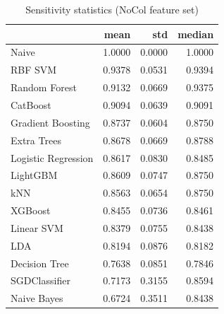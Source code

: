 \begin{table}
\caption{Sensitivity statistics (NoCol feature set)}
\label{tab:sensitivity_NoCol_stats}
\begin{tabular}{lrrr}
\toprule
 & mean & std & median \\
\midrule
Naive & 1.0000 & 0.0000 & 1.0000 \\
RBF SVM & 0.9378 & 0.0531 & 0.9394 \\
Random Forest & 0.9132 & 0.0669 & 0.9375 \\
CatBoost & 0.9094 & 0.0639 & 0.9091 \\
Gradient Boosting & 0.8737 & 0.0604 & 0.8750 \\
Extra Trees & 0.8678 & 0.0669 & 0.8788 \\
Logistic Regression & 0.8617 & 0.0830 & 0.8485 \\
LightGBM & 0.8609 & 0.0747 & 0.8750 \\
kNN & 0.8563 & 0.0654 & 0.8750 \\
XGBoost & 0.8455 & 0.0736 & 0.8461 \\
Linear SVM & 0.8379 & 0.0755 & 0.8438 \\
LDA & 0.8194 & 0.0876 & 0.8182 \\
Decision Tree & 0.7638 & 0.0851 & 0.7846 \\
SGDClassifier & 0.7173 & 0.3155 & 0.8594 \\
Naive Bayes & 0.6724 & 0.3511 & 0.8438 \\
\bottomrule
\end{tabular}
\end{table}
